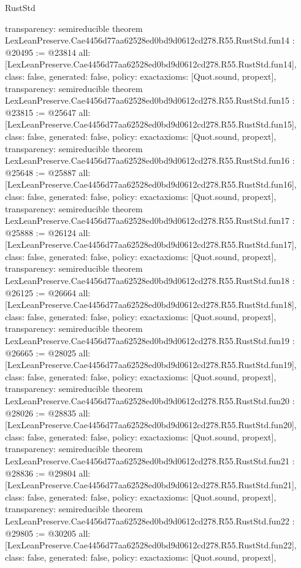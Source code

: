 \begin{lexlean}{RustStd}
\begin{coremodule}
{  transparency: semireducible
}
theorem LexLeanPreserve.Cae4456d77aa62528ed0bd9d0612cd278.R55.RustStd.fun14 : @20495 := @23814 {
  all: [LexLeanPreserve.Cae4456d77aa62528ed0bd9d0612cd278.R55.RustStd.fun14],
  class: false,
  generated: false,
  policy: exact{axioms: [Quot.sound, propext]},
  transparency: semireducible
}
theorem LexLeanPreserve.Cae4456d77aa62528ed0bd9d0612cd278.R55.RustStd.fun15 : @23815 := @25647 {
  all: [LexLeanPreserve.Cae4456d77aa62528ed0bd9d0612cd278.R55.RustStd.fun15],
  class: false,
  generated: false,
  policy: exact{axioms: [Quot.sound, propext]},
  transparency: semireducible
}
theorem LexLeanPreserve.Cae4456d77aa62528ed0bd9d0612cd278.R55.RustStd.fun16 : @25648 := @25887 {
  all: [LexLeanPreserve.Cae4456d77aa62528ed0bd9d0612cd278.R55.RustStd.fun16],
  class: false,
  generated: false,
  policy: exact{axioms: [Quot.sound, propext]},
  transparency: semireducible
}
theorem LexLeanPreserve.Cae4456d77aa62528ed0bd9d0612cd278.R55.RustStd.fun17 : @25888 := @26124 {
  all: [LexLeanPreserve.Cae4456d77aa62528ed0bd9d0612cd278.R55.RustStd.fun17],
  class: false,
  generated: false,
  policy: exact{axioms: [Quot.sound, propext]},
  transparency: semireducible
}
theorem LexLeanPreserve.Cae4456d77aa62528ed0bd9d0612cd278.R55.RustStd.fun18 : @26125 := @26664 {
  all: [LexLeanPreserve.Cae4456d77aa62528ed0bd9d0612cd278.R55.RustStd.fun18],
  class: false,
  generated: false,
  policy: exact{axioms: [Quot.sound, propext]},
  transparency: semireducible
}
theorem LexLeanPreserve.Cae4456d77aa62528ed0bd9d0612cd278.R55.RustStd.fun19 : @26665 := @28025 {
  all: [LexLeanPreserve.Cae4456d77aa62528ed0bd9d0612cd278.R55.RustStd.fun19],
  class: false,
  generated: false,
  policy: exact{axioms: [Quot.sound, propext]},
  transparency: semireducible
}
theorem LexLeanPreserve.Cae4456d77aa62528ed0bd9d0612cd278.R55.RustStd.fun20 : @28026 := @28835 {
  all: [LexLeanPreserve.Cae4456d77aa62528ed0bd9d0612cd278.R55.RustStd.fun20],
  class: false,
  generated: false,
  policy: exact{axioms: [Quot.sound, propext]},
  transparency: semireducible
}
theorem LexLeanPreserve.Cae4456d77aa62528ed0bd9d0612cd278.R55.RustStd.fun21 : @28836 := @29804 {
  all: [LexLeanPreserve.Cae4456d77aa62528ed0bd9d0612cd278.R55.RustStd.fun21],
  class: false,
  generated: false,
  policy: exact{axioms: [Quot.sound, propext]},
  transparency: semireducible
}
theorem LexLeanPreserve.Cae4456d77aa62528ed0bd9d0612cd278.R55.RustStd.fun22 : @29805 := @30205 {
  all: [LexLeanPreserve.Cae4456d77aa62528ed0bd9d0612cd278.R55.RustStd.fun22],
  class: false,
  generated: false,
  policy: exact{axioms: [Quot.sound, propext]},
}
\end{coremodule}
\end{lexlean}
